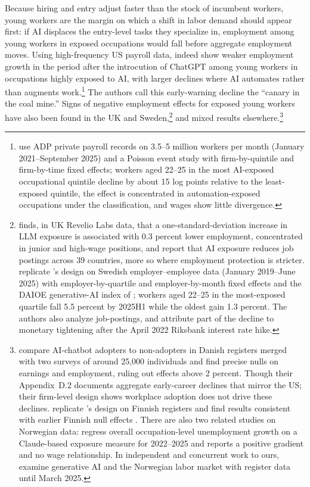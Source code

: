 \documentclass[12pt]{article}
\begin{document}
Because hiring and entry adjust faster than the stock of incumbent workers, young workers are the margin on which a shift in labor demand should appear first: if AI displaces the entry-level tasks they specialize in, employment among young workers in exposed occupations would fall before aggregate employment moves. Using high-frequency US payroll data, \citet{brynjolfsson2025} indeed show weaker employment growth in the period after the introcution of ChatGPT among young workers in occupations highly exposed to AI, with larger declines where AI automates rather than augments work.\footnote{\citet{brynjolfsson2025} use ADP private payroll records on 3.5--5 million workers per month (January 2021--September 2025) and a Poisson event study with firm-by-quintile and firm-by-time fixed effects; workers aged 22--25 in the most AI-exposed occupational quintile decline by about 15 log points relative to the least-exposed quintile, the effect is concentrated in automation-exposed occupations under the \citet{handa2025} classification, and wages show little divergence.} The authors call this early-warning decline the ``canary in the coal mine.'' 
Signs of negative employment effects for exposed young workers have also been found in the UK and Sweden,\footnote{\citet{teeselink2025} finds, in UK Revelio Labs data, that a one-standard-deviation increase in LLM exposure is associated with 0.3 percent lower employment, concentrated in junior and high-wage positions, and \citet{teeselink2026} report that AI exposure reduces job postings across 39 countries, more so where employment protection is stricter. \citet{lodefalk2026} replicate \citet{brynjolfsson2025}'s design on Swedish employer--employee data (January 2019--June 2025) with employer-by-quartile and employer-by-month fixed effects and the DAIOE generative-AI index of \citet{engberg2024}; workers aged 22--25 in the most-exposed quartile fall 5.5 percent by 2025H1 while the oldest gain 1.3 percent. The authors also analyze job-postings, and attribute part of the decline to monetary tightening after the April 2022 Riksbank interest rate hike.} 
and mixed results elsewhere.\footnote{\citet{humlum2026} compare AI-chatbot adopters to non-adopters in Danish registers merged with two surveys of around 25,000 individuals and find precise nulls on earnings and employment, ruling out effects above 2 percent. Though their Appendix~D.2 documents aggregate early-career declines that mirror the US; their firm-level design shows workplace adoption does not drive these declines. \citet{kauhanen2026} replicate \citet{brynjolfsson2025}'s design on Finnish registers and find results consistent with earlier Finnish null effects \citep{kauhanen2024, kauhanen2025}. There are also two related studies on Norwegian data: \citet{menon2026} regress overall occupation-level unemployment growth on a Claude-based exposure measure for 2022--2025 and reports a positive gradient and no wage relationship. In independent and concurrent work to ours, \citet{facius2026labor} examine generative AI and the Norwegian labor market with register data until March 2025.}
\end{document}

